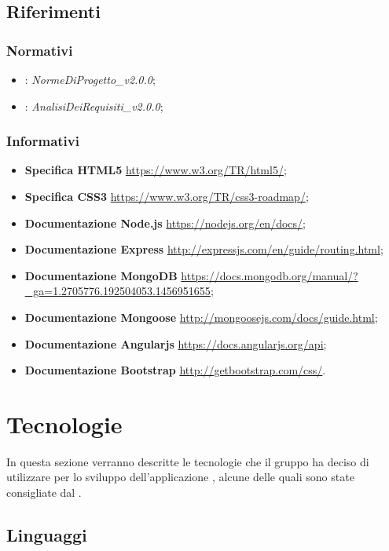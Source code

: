 \documentclass[12pt,a4paper]{article}
\begin{document}
\subsection{Riferimenti}

\subsubsection{Normativi}
\begin{itemize}
    \item \NdP{}: \textit{NormeDiProgetto\_v2.0.0};
    \item \AdR{}: \textit{AnalisiDeiRequisiti\_v2.0.0};
\end{itemize}

\subsubsection{Informativi}
\begin{itemize}
    \item \textbf{Specifica HTML5} \url{https://www.w3.org/TR/html5/};
    \item \textbf{Specifica CSS3} \url{https://www.w3.org/TR/css3-roadmap/};
    \item \textbf{Documentazione Node.js} \url{https://nodejs.org/en/docs/};
    \item \textbf{Documentazione Express} \url{http://expressjs.com/en/guide/routing.html};
    \item \textbf{Documentazione MongoDB} \url{https://docs.mongodb.org/manual/?_ga=1.2705776.192504053.1456951655};
    \item \textbf{Documentazione Mongoose} \url{http://mongoosejs.com/docs/guide.html};
    \item \textbf{Documentazione Angularjs} \url{https://docs.angularjs.org/api};
    \item \textbf{Documentazione Bootstrap} \url{http://getbootstrap.com/css/}.
\end{itemize}

\newpage

\section{Tecnologie}\label{tecnologie}
In questa sezione verranno descritte le tecnologie che il gruppo ha deciso di utilizzare per lo sviluppo dell'applicazione \prjL{}, alcune delle quali sono state consigliate dal .

\subsection{Linguaggi}
\end{document}
